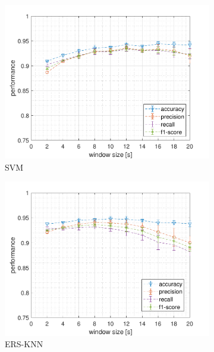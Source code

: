 \begin{figure}[!htb]
    \centering
    \begin{subfigure}{.45\textwidth}
        \includegraphics[width=\textwidth]{figure/svm_window.pdf}
        \caption{SVM}
        \label{fig:window:svm}
    \end{subfigure}
    \begin{subfigure}{.45\textwidth}
        \includegraphics[width=\textwidth]{figure/knn_window.pdf}
        \caption{ERS-KNN}
        \label{fig:window:knn}
    \end{subfigure}
    \begin{subfigure}{.45\textwidth}

\end{subfigure}
\end{figure}

